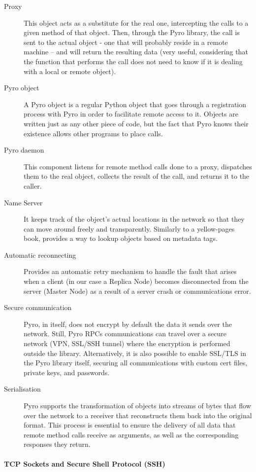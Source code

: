 \begin{description}
	\item [Proxy] This object acts as a substitute for the real one, intercepting the calls to a given method of that object. Then, through the Pyro library, the call is sent to the actual object - one that will probably reside in a remote machine – and will return the resulting data (very useful, considering that the function that performs the call does not need to know if it is dealing with a local or remote object).
	\item [Pyro object] A Pyro object is a regular Python object that goes through a registration process with Pyro in order to facilitate remote access to it. Objects are written just as any other piece of code, but the fact that Pyro knows their existence allows other programs to place calls.
	\item [Pyro daemon] This component listens for remote method calls done to a proxy, dispatches them to the real object, collects the result of the call, and returns it to the caller.
	\item [Name Server] It keeps track of the object's actual locations in the network so that they can move around freely and transparently. Similarly to a yellow-pages book, provides a way to lookup objects based on metadata tags.
	\item [Automatic reconnecting] Provides an automatic retry mechanism to handle the fault that arises when a client (in our case a Replica Node) becomes disconnected from the server (Master Node) as a result of a server crash or communications error.
	\item [Secure communication] Pyro, in itself, does not encrypt by default the data it sends over the network. Still, Pyro RPCs communications can travel over a secure network (VPN, SSL/SSH tunnel) where the encryption is performed outside the library. Alternatively, it is also possible to enable SSL/TLS in the Pyro library itself, securing all communications with custom cert files, private keys, and passwords.
	\item [Serialisation] Pyro supports the transformation of objects into streams of bytes that flow over the network to a receiver that reconstructs them back into the original format. This process is essential to ensure the delivery of all data that remote method calls receive as arguments, as well as the corresponding responses they return.
\end{description}


\paragraph{TCP Sockets and Secure Shell Protocol (SSH)}
\label{par:impl_tcp_sockets_ssh}

